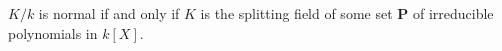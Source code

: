 $K/k$ is normal if and only if $K$ is the splitting field of some set $\mathbf{P}$ of irreducible polynomials in $k[X]$.
